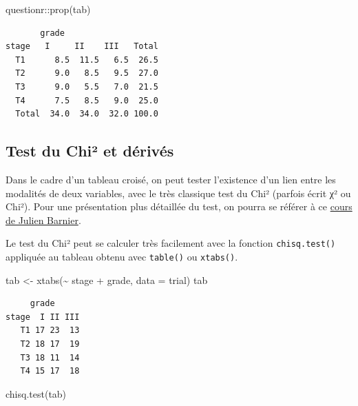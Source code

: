 \documentclass[
  letterpaper,
  DIV=11,
  numbers=noendperiod,
  oneside]{scrreprt}
\newenvironment{Shaded}{\begin{snugshade}}{\end{snugshade}}
\newcommand{\AttributeTok}[1]{\textcolor[rgb]{0.40,0.45,0.13}{#1}}
\newcommand{\FunctionTok}[1]{\textcolor[rgb]{0.28,0.35,0.67}{#1}}
\newcommand{\NormalTok}[1]{\textcolor[rgb]{0.00,0.23,0.31}{#1}}
\newcommand{\OtherTok}[1]{\textcolor[rgb]{0.00,0.23,0.31}{#1}}
\newcommand{\SpecialCharTok}[1]{\textcolor[rgb]{0.37,0.37,0.37}{#1}}
\begin{document}
\begin{Shaded}
\begin{Highlighting}[]
\NormalTok{questionr}\SpecialCharTok{::}\FunctionTok{prop}\NormalTok{(tab)}
\end{Highlighting}
\end{Shaded}

\begin{verbatim}
       grade
stage   I     II    III   Total
  T1      8.5  11.5   6.5  26.5
  T2      9.0   8.5   9.5  27.0
  T3      9.0   5.5   7.0  21.5
  T4      7.5   8.5   9.0  25.0
  Total  34.0  34.0  32.0 100.0
\end{verbatim}

\hypertarget{test-du-chiuxb2-et-duxe9rivuxe9s}{%
\subsection{Test du Chi² et
dérivés}\label{test-du-chiuxb2-et-duxe9rivuxe9s}}

Dans le cadre d'un tableau croisé, on peut tester l'existence d'un lien
entre les modalités de deux variables, avec le très classique test du
Chi² (parfois écrit χ² ou Chi²). Pour une présentation plus détaillée du
test, on pourra se référer à ce
\href{https://github.com/juba/archive_doc_khi2/raw/master/khi2.pdf}{cours
de Julien Barnier}.

Le test du Chi² peut se calculer très facilement avec la fonction
\texttt{chisq.test()} appliquée au tableau obtenu avec \texttt{table()}
ou \texttt{xtabs()}.

\begin{Shaded}
\begin{Highlighting}[]
\NormalTok{tab }\OtherTok{\textless{}{-}} \FunctionTok{xtabs}\NormalTok{(}\SpecialCharTok{\textasciitilde{}}\NormalTok{ stage }\SpecialCharTok{+}\NormalTok{ grade, }\AttributeTok{data =}\NormalTok{ trial)}
\NormalTok{tab}
\end{Highlighting}
\end{Shaded}

\begin{verbatim}
     grade
stage  I II III
   T1 17 23  13
   T2 18 17  19
   T3 18 11  14
   T4 15 17  18
\end{verbatim}

\begin{Shaded}
\begin{Highlighting}[]
\FunctionTok{chisq.test}\NormalTok{(tab)}
\end{Highlighting}
\end{Shaded}
\end{document}
